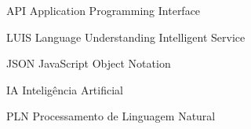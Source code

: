 \begin{siglas}
\item[API] Application Programming Interface
\item[LUIS] Language Understanding Intelligent Service
\item[JSON] JavaScript Object Notation
\item[IA] Inteligência Artificial
\item[PLN] Processamento de Linguagem Natural 
\end{siglas}
